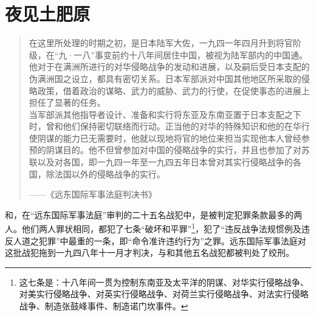\fancyhead[RO]{} %
\fancyhead[LE]{} %
\chapter*{夜见土肥原}
\thispagestyle{empty}
\begin{quote}
	在这里所处理的时期之初，是日本陆军大佐，一九四一年四月升到将官阶级，在“九·一八”事变前约十八年间居住中国，被视为陆军部内的中国通。他对于在满洲所进行的对华侵略战争的发动和进展，以及嗣后受日本支配的伪满洲国之设立，都具有密切关系。日本军部派对中国其他地区所采取的侵略政策，借着政治的谋略、武力的威胁、武力的行使，在促使事态的进展上担任了显著的任务。\\

当军部派其他指导者设计、准备和实行将东亚及东南亚置于日本支配之下时，曾和他们保持密切联络而行动。正当他的对华的特殊知识和他的在华行使阴谋的能力已无需要时，他就以现地将官的地位来担当实现他本人曾经参预的阴谋目的。他不但曾参加对中国的侵略战争的实行，并且也参加了对苏联以及对各国，即一九四一年至一九四五年日本曾对其实行侵略战争的各国，除法国以外的侵略战争的实行。\\

\begin{flushright}
	——《远东国际军事法庭判决书》\\
\end{flushright}
\end{quote}

和，在“远东国际军事法庭”审判的二十五名战犯中，是被判定犯罪条款最多的两人。他们两人罪状相同，都犯了七条“破坏和平罪”\footnote{这七条是：十八年间一贯为控制东南亚及太平洋的阴谋、对华实行侵略战争、对美实行侵略战争、对英实行侵略战争、对荷兰实行侵略战争、对法实行侵略战争、制造张鼓峰事件、制造诺门坎事件。}，犯了“违反战争法规惯例及违反人道之犯罪”中最重的一条，即“命令准许违约行为”之罪。远东国际军事法庭对这批战犯拖到一九四八年十一月才判决，与和其他五名战犯都被判处了绞刑。\\

